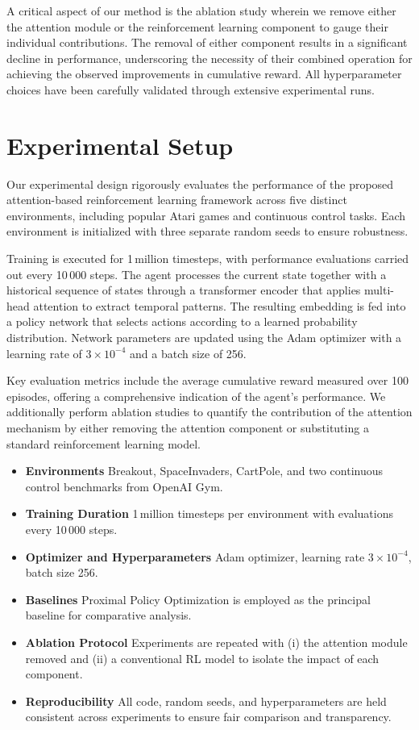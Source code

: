 \documentclass{article}
\begin{document}
A critical aspect of our method is the ablation study wherein we remove either the attention module or the reinforcement learning component to gauge their individual contributions. The removal of either component results in a significant decline in performance, underscoring the necessity of their combined operation for achieving the observed improvements in cumulative reward. All hyperparameter choices have been carefully validated through extensive experimental runs.

\section{Experimental Setup}
Our experimental design rigorously evaluates the performance of the proposed attention-based reinforcement learning framework across five distinct environments, including popular Atari games and continuous control tasks. Each environment is initialized with three separate random seeds to ensure robustness.

Training is executed for 1\,million timesteps, with performance evaluations carried out every 10\,000 steps. The agent processes the current state together with a historical sequence of states through a transformer encoder that applies multi-head attention to extract temporal patterns. The resulting embedding is fed into a policy network that selects actions according to a learned probability distribution. Network parameters are updated using the Adam optimizer with a learning rate of $3\times10^{-4}$ and a batch size of 256.

Key evaluation metrics include the average cumulative reward measured over 100 episodes, offering a comprehensive indication of the agent's performance. We additionally perform ablation studies to quantify the contribution of the attention mechanism by either removing the attention component or substituting a standard reinforcement learning model.

\begin{itemize}
    \item \textbf{Environments} Breakout, SpaceInvaders, CartPole, and two continuous control benchmarks from OpenAI Gym.
    \item \textbf{Training Duration} 1\,million timesteps per environment with evaluations every 10\,000 steps.
    \item \textbf{Optimizer and Hyperparameters} Adam optimizer, learning rate $3\times10^{-4}$, batch size 256.
    \item \textbf{Baselines} Proximal Policy Optimization  is employed as the principal baseline for comparative analysis.
    \item \textbf{Ablation Protocol} Experiments are repeated with (i) the attention module removed and (ii) a conventional RL model to isolate the impact of each component.
    \item \textbf{Reproducibility} All code, random seeds, and hyperparameters are held consistent across experiments to ensure fair comparison and transparency.
\end{itemize}
\end{document}
